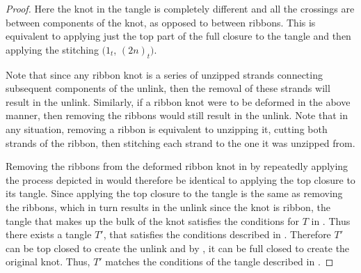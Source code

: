 \begin{paper}
\begin{proof}


Here the knot in the tangle is completely different and all the crossings are
between components of the knot, as opposed to between ribbons.
This is equivalent to applying just the top part of the full closure to the
tangle and then applying the stitching $(1_t$, $(2n)_t)$.



Note that since any ribbon knot is a series of unzipped strands connecting
subsequent components of the unlink, then the removal of these strands will
result in the unlink.
Similarly, if a ribbon knot were to be deformed in the above manner, then
removing the ribbons would still result in the unlink.
Note that in any situation, removing a ribbon is equivalent to unzipping
it, cutting both strands of the ribbon, then stitching each strand to the one it
was unzipped from.



Removing the ribbons from the deformed ribbon knot in \figTwisted by repeatedly
applying the process depicted in \figCut would therefore be identical to
applying the top closure to its tangle.
Since applying the top closure to the tangle is the same as removing the
ribbons, which in turn results in the unlink since the knot is ribbon, the
tangle that makes up the bulk of the knot satisfies the conditions for $T$ in
\lemTangles.
Thus there exists a tangle $T'$, that satisfies the conditions described in
\lemTangles.
Therefore $T'$ can be top closed to create the unlink and by \figComplete, it
can be full closed to create the original knot.
Thus, $T'$ matches the conditions of the tangle described in \thmRibbon.
\end{proof}


\end{paper}
